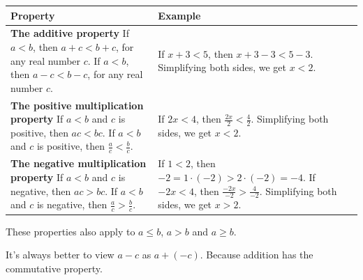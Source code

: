 \documentclass[en,12pt]{elegantbook}
\let\BeginKnitrBlock\begin \let\EndKnitrBlock\end
\begin{document}
\begin{longtable}[]{@{}ll@{}}
\toprule
\begin{minipage}[b]{0.47\columnwidth}\raggedright
Property\strut
\end{minipage} & \begin{minipage}[b]{0.47\columnwidth}\raggedright
Example\strut
\end{minipage}\tabularnewline
\midrule
\endhead
\begin{minipage}[t]{0.47\columnwidth}\raggedright
\textbf{The additive property} If \(a<b\), then \(a+c<b+c\), for any real number \(c\). If \(a<b\), then \(a-c<b-c\), for any real number \(c\).\strut
\end{minipage} & \begin{minipage}[t]{0.47\columnwidth}\raggedright
If \(x+3<5\), then \(x+3-3<5-3\). Simplifying both sides, we get \(x<2\).\strut
\end{minipage}\tabularnewline
\begin{minipage}[t]{0.47\columnwidth}\raggedright
\textbf{The positive multiplication property} If \(a<b\) and \(c\) is positive, then \(ac<bc\). If \(a<b\) and \(c\) is positive, then \(\frac ac<\frac bc\).\strut
\end{minipage} & \begin{minipage}[t]{0.47\columnwidth}\raggedright
If \(2x<4\), then \(\frac{2x}{2}<\frac{4}{2}\). Simplifying both sides, we get \(x<2\).\strut
\end{minipage}\tabularnewline
\begin{minipage}[t]{0.47\columnwidth}\raggedright
\textbf{The negative multiplication property} If \(a<b\) and \(c\) is negative, then \(ac>bc\). If \(a<b\) and \(c\) is negative, then \(\frac ac>\frac bc\).\strut
\end{minipage} & \begin{minipage}[t]{0.47\columnwidth}\raggedright
If \(1<2\), then \(-2=1\cdot(-2)>2\cdot(-2)=-4\). If \(-2x<4\), then \(\frac{-2x}{-2}>\frac{4}{-2}\). Simplifying both sides, we get \(x>2\).\strut
\end{minipage}\tabularnewline
\bottomrule
\end{longtable}

\BeginKnitrBlock{rmdnote}
These properties also apply to \(a\leq b\), \(a>b\) and \(a\geq b\).
\EndKnitrBlock{rmdnote}

\BeginKnitrBlock{rmdnote}
It's always better to view \(a-c\) as \(a+(-c)\). Because addition has the commutative property.
\EndKnitrBlock{rmdnote}
\end{document}
